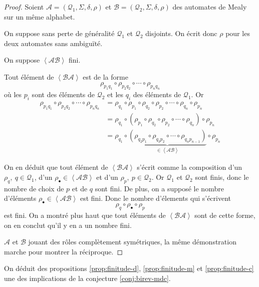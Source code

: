 \documentclass[11pt,a4paper]{article}
\begin{document}
\begin{proof}
  Soient $\mathcal{A}=\left(\mathcal{Q}_1, \Sigma, \delta, \rho\right)$ et $\mathcal{B}=\left(\mathcal{Q}_2, \Sigma, \delta, \rho\right)$ des automates de Mealy sur un même alphabet.

  On suppose sans perte de généralité $\mathcal{Q}_1$ et $\mathcal{Q}_2$ disjoints. On écrit donc $\rho$ pour les deux automates sans ambiguïté.

  On suppose $\left<\mathcal{A}\mathcal{B}\right>$ fini.

  Tout élément de $\left<\mathcal{B}\mathcal{A}\right>$ est de la forme
  \[
    \rho_{p_1q_1}\circ\rho_{p_2q_2}\circ\cdots\circ\rho_{p_nq_n}
  \]
  où les $p_i$ sont des éléments de $\mathcal{Q}_2$ et les $q_i$ des éléments de $\mathcal{Q}_1$. Or
  \begin{align*}
    \rho_{p_1q_1}\circ\rho_{p_2q_2}\circ\cdots\circ\rho_{p_nq_n} &= \rho_{q_1}\circ\rho_{p_1}\circ\rho_{q_2}\circ\rho_{p_2}\circ\cdots\circ\rho_{q_n}\circ\rho_{p_n} \\
    &=\rho_{q_1}\circ\left(\rho_{p_1}\circ\rho_{q_2}\circ\rho_{p_2}\circ\cdots\circ\rho_{q_n}\right)\circ\rho_{p_n} \\
    &=\rho_{q_1}\circ\underbrace{\left(\rho_{q_2p_1}\circ\rho_{q_3p_2}\circ\cdots\circ\rho_{q_np_{n-1}}\right)}_{\in\left<\mathcal{A}\mathcal{B}\right>}\circ\rho_{p_n}
  \end{align*}

  On en déduit que tout élément de $\left<\mathcal{B}\mathcal{A}\right>$ s'écrit comme la composition d'un $\rho_{q},~q\in\mathcal{Q}_1$, d'un $\rho_\bullet\in\left<\mathcal{A}\mathcal{B}\right>$ et d'un $\rho_{p},~p\in\mathcal{Q}_2$. Or $\mathcal{Q}_1$ et $\mathcal{Q}_2$ sont finis, donc le nombre de choix de $p$ et de $q$ sont fini. De plus, on a supposé le nombre d'éléments $\rho_\bullet\in\left<\mathcal{A}\mathcal{B}\right>$ est fini. Donc le nombre d'élements qui s'écrivent \[ \rho_q\circ\rho_\bullet\circ\rho_p \] est fini. On a montré plus haut que tout éléments de $\left<\mathcal{B}\mathcal{A}\right>$ sont de cette forme, on en conclut qu'il y en a un nombre fini.

  $\mathcal{A}$ et $\mathcal{B}$ jouant des rôles complètement symétriques, la même démonstration marche pour montrer la réciproque.
\end{proof}

On déduit des propositions \ref{prop:finitude-d}, \ref{prop:finitude-m} et \ref{prop:finitude-c} une des implications de la conjecture \ref{conj:birev-mdc}.
\end{document}
